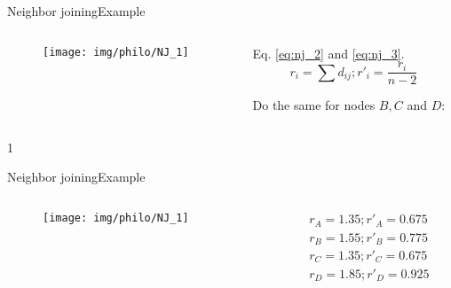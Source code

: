 \documentclass[10pt]{beamer}
\def\mysol{0}
\def\mysol{1}
\newcommand{\1}{
	\setbeamertemplate{background}{
		\texttt{[image: img/1]}
		\tikz[overlay] \fill[fill opacity=0.75,fill=white] (0,0) rectangle (-\paperwidth,\paperheight);
	}
}
\begin{document}
\begin{frame}{Neighbor joining}{Example}
	\begin{columns}
		\begin{column}{0.48\textwidth}
			\begin{figure}
				\texttt{[image: img/philo/NJ\_1]}
			\end{figure}
		\end{column}
		\begin{column}{0.48\textwidth}
			Eq. \ref{eq:nj_2} and \ref{eq:nj_3}.	
			\begin{equation*}
			r_i = \sum d_{ij}; r'_i =  \frac{r_i}{n-2}
			\end{equation*} 
			
			Do the same for nodes $B, C$ and $D$:
		\end{column}
	\end{columns}
\end{frame}

\if\mysol1
\begin{frame}{Neighbor joining}{Example}
	\begin{columns}
		\begin{column}{0.48\textwidth}
			\begin{figure}
				\texttt{[image: img/philo/NJ\_1]}
			\end{figure}
		\end{column}
		\begin{column}{0.48\textwidth}
			\begin{equation*}
				\begin{split}
					r_A = 1.35 ; r'_A = 0.675  \\
					r_B = 1.55 ; r'_B = 0.775 \\ 
					r_C = 1.35 ; r'_C = 0.675 \\ 
					r_D = 1.85 ; r'_D = 0.925 
				\end{split}
			\end{equation*} 
			
			
		\end{column}
	\end{columns}
\end{frame}
\fi
\end{document}
